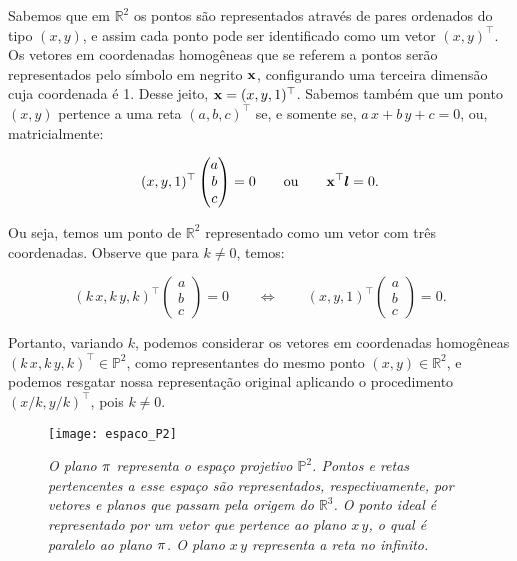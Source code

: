 Sabemos que em $\mathbb{R}^{2}$ os pontos são representados através de pares ordenados do tipo $(x,y)$, e assim cada ponto pode ser identificado como um vetor $(x,y)^\top$. Os vetores em coordenadas homogêneas que se referem a pontos serão representados pelo símbolo em negrito $\mathbf{x}$, configurando uma terceira dimensão cuja coordenada é 1. Desse jeito, $\mathbf{x}=(x,y,1)^\top$. Sabemos também que um ponto $(x,y)$ pertence a uma reta $(a,b,c)^\top$ se, e somente se, $a\,x+b\,y+c=0$, ou, matricialmente:

\begin{equation*}
(x,y,1)^\top 
\begin{pmatrix}
 a  \\ 
 b  \\ 
 c 
 \end{pmatrix} 
 = 0 \qquad 
 \text{ou} 
 \qquad \mathbf{x} ^\top\boldsymbol{l} = 0.
\end{equation*}

Ou seja, temos um ponto de $\mathbb{R}^{2}$ representado como um vetor com três coordenadas. Observe que para $k\neq 0$, temos:

\begin{equation*}
(k\,x,k\,y,k)^\top 
\begin{pmatrix}
 a  \\ 
 b  \\ 
 c 
 \end{pmatrix} 
 = 0
 \qquad \Leftrightarrow \qquad
 (x,y,1)^\top
\begin{pmatrix}
 a  \\ 
 b  \\ 
 c 
 \end{pmatrix} 
 = 0.
\end{equation*}

Portanto,  variando $k$, podemos considerar os vetores em coordenadas homogêneas $(k\,x,k\,y,k)^\top \in \mathbb{P}^2$, como representantes do mesmo ponto $(x,y) \in \mathbb{R}^2$, e podemos resgatar nossa representação original aplicando o procedimento $(x/k,y/k)^\top$, pois $k \ne 0$.

\begin{figure}[!htb]
\centering
\texttt{[image: espaco\_P2]}
\caption{\textit{O plano $\pi$ representa o espaço projetivo $\mathbb{P}^2$. Pontos e retas pertencentes a esse espaço são representados, respectivamente, por vetores e planos que passam pela origem do $\mathbb{R}^3$. O ponto ideal é representado por um vetor que pertence ao plano $x\,y$, o qual é paralelo ao plano $\pi$. O plano $x\,y$ representa a reta no infinito.}}
\label{plano_P2}
\end{figure}

